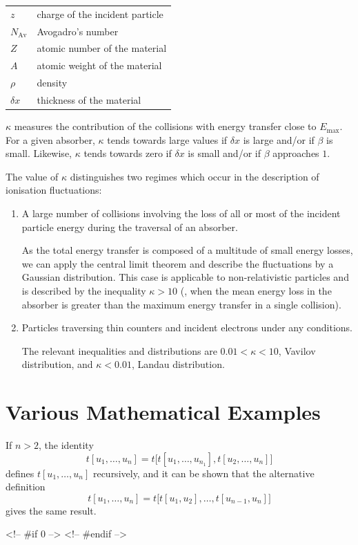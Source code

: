 \begin{tabular}{ll}
$z$          & charge of the incident particle \\
$N_{\textrm{Av}}$     & Avogadro's number \\
$Z$          & atomic number of the material \\
$A$          & atomic weight of the material \\
$\rho$       & density \\
$ \delta x$  & thickness of the material \\
\end{tabular}

$\kappa$ measures the contribution of the collisions with energy
transfer close to $E_{\textrm{max}}$.  For a given absorber, $\kappa$
tends
towards large values if $\delta x$ is large and/or if $\beta$ is
small.  Likewise, $\kappa$ tends towards zero if $\delta x$ is small
and/or if $\beta$ approaches $1$.

The value of $\kappa$ distinguishes two regimes which occur in the
description of ionisation fluctuations:

\begin{enumerate}
\item A large number of collisions involving the loss of all or most
    of the incident particle energy during the traversal of an absorber.

    As the total energy transfer is composed of a multitude of small
    energy losses, we can apply the central limit theorem and describe
    the fluctuations by a Gaussian distribution.  This case is
    applicable to non-relativistic particles and is described by the
    inequality $\kappa > 10 $ (\ie, when the mean energy loss in the
    absorber is greater than the maximum energy transfer in a single
    collision).

\item Particles traversing thin counters and incident electrons under
    any conditions.

    The relevant inequalities and distributions are $ 0.01 < \kappa < 10
    $,
    Vavilov distribution, and $\kappa < 0.01 $, Landau distribution.
\end{enumerate}


\section{Various Mathematical Examples}
If $n > 2$, the identity
\begin{equation*}
    t[u_1,\dots,u_n] = t\bigl[t[u_1,\dots,u_{n_1}], t[u_2,\dots,u_n]
    \bigr]
\end{equation*}
defines $t[u_1,\dots,u_n]$ recursively, and it can be shown that the
alternative definition
\begin{equation*}
    t[u_1,\dots,u_n] = t\bigl[t[u_1,u_2],\dots,t[u_{n-1},u_n]\bigr]
\end{equation*}
gives the same result.

<!-- #if 0 -->
<!-- #endif -->
